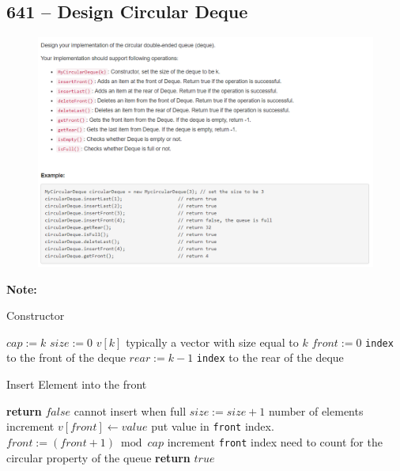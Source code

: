 \documentclass[a4paper,12pt]{article}
\begin{document}
\subsection{641 -- Design Circular Deque}
\begin{figure}[H]
	\begin{center}
		\includegraphics[width=18cm]{641.png}
	\end{center}
\end{figure}
\textbf{\large{Note:}}
\par
\vspace{0.5em}
\begin{algorithm}[H]
	\caption{Constructor}
	\label{deque-ctor}
	\begin{algorithmic}[1]
		\State $cap := k$
		\State $size := 0$
		\State $v[k]$ \Comment typically a vector with size equal to $k$
		\State $front := 0$ \Comment \texttt{index} to the front of the deque
		\State $rear := k-1$ \Comment \texttt{index} to the rear of the deque
		\EndProcedure
	\end{algorithmic}
\end{algorithm}
	
\begin{algorithm}[H]
	\caption{Insert Element into the front}
	\label{deque-insert-front}
	\begin{algorithmic}
		\If {\ref{QCheckFull}}
		\State \textbf{return} $false$ \Comment cannot insert when full
		\EndIf
		\State $size := size + 1$ \Comment number of elements increment
		\State $v[front] \gets value$ \Comment put value in \texttt{front} index.
		\State $front := (front + 1) \bmod cap$ \Comment increment \texttt{front} index
		\State \Comment need to count for the circular property of the queue
		\State \textbf{return} $true$
		\EndProcedure
	\end{algorithmic}
\end{algorithm}
\end{document}
